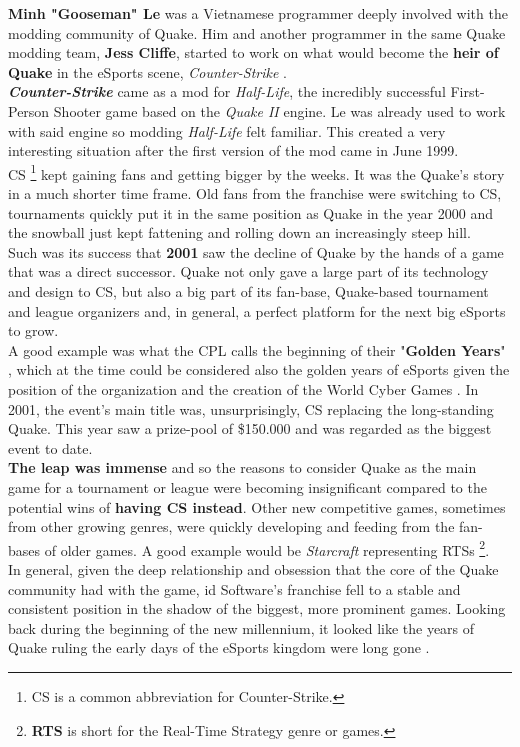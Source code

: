 \textbf{Minh "Gooseman" Le} \citep{gooseman} was a Vietnamese programmer deeply involved with the modding community of Quake. Him and another programmer in the same Quake modding team, \textbf{Jess Cliffe}, started to work on what would become the \textbf{heir of Quake} in the eSports scene, \textit{Counter-Strike} \citep{game:cs}.\\

\textit{\textbf{Counter-Strike}} came as a mod for \textit{Half-Life}, the incredibly successful First-Person Shooter game based on the \textit{Quake II} engine. Le was already used to work with said engine so modding \textit{Half-Life} felt familiar. This created a very interesting situation after the first version of the mod came in June 1999.\\

CS \footnote{CS is a common abbreviation for Counter-Strike.} kept gaining fans and getting bigger by the weeks. It was the Quake's story in a much shorter time frame. Old fans from the franchise were switching to CS, tournaments quickly put it in the same position as Quake in the year 2000 and the snowball just kept fattening and rolling down an increasingly steep hill.\\

Such was its success that \textbf{2001} saw the decline of Quake by the hands of a game that was a direct successor. Quake not only gave a large part of its technology and design to CS, but also a big part of its fan-base, Quake-based tournament and league organizers and, in general, a perfect platform for the next big eSports to grow.\\

A good example was what the CPL calls the beginning of their "\textbf{Golden Years}" \citep{web:cpl}, which at the time could be considered also the golden years of eSports given the position of the organization and the creation of the World Cyber Games \citep{WCG} \parencite[p.~28]{snavely2014history}. In 2001, the event's main title was, unsurprisingly, CS replacing the long-standing Quake. This year saw a prize-pool of \$150.000 and was regarded as the biggest event to date.\\

\textbf{The leap was immense} \citep{hope2014evolution} and so the reasons to consider Quake as the main game for a tournament or league were becoming insignificant compared to the potential wins of \textbf{having CS instead}. Other new competitive games, sometimes from other growing genres, were quickly developing and feeding from the fan-bases of older games. A good example would be \textit{Starcraft} \citep{game:starcraft} representing RTSs \footnote{\textbf{RTS} is short for the Real-Time Strategy genre or games.}.\\

In general, given the deep relationship and obsession that the core of the Quake community had with the game, id Software's franchise fell to a stable and consistent position in the shadow of the biggest, more prominent games. Looking back during the beginning of the new millennium, it looked like the years of Quake ruling the early days of the eSports kingdom were long gone \parencite{edwards2013esports}.
